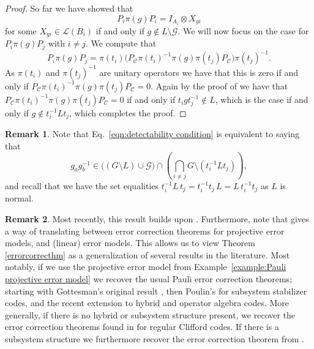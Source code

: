 \documentclass[11pt]{article}
\theoremstyle{definition}
\newtheorem*{remark}{Remark}
\newcommand{\calC}{\mathcal{C}}
\newcommand{\calG}{\mathcal{G}}
\newcommand{\calL}{\mathcal{L}}
\begin{document}
\begin{proof}
    So far we have showed that
    \[
        P_i \pi(g) P_i = I_{A_i} \otimes X_{gi}
    \]
    for some $X_{gi} \in \calL(B_i)$ if and only if $g \not\in L \setminus \calG$. We will now focus on the case for $P_i \pi(g) P_j$ with $i \neq j$. We compute that
    \[
        P_i \pi(g) P_j
        = \pi(t_i) \big( P_\calC \pi(t_i)^{-1} \pi(g) \pi(t_j) P_\calC \big) \pi(t_j)^{-1}.
    \]
    As $\pi(t_i)$ and $\pi(t_j)^{-1}$ are unitary operators we have that this is zero if and only if $P_\calC \pi(t_i)^{-1} \pi(g) \pi(t_j) P_\calC = 0$. Again by the proof of \cite[Theorem 6.3]{Eidesen2025} we have that $P_\calC \pi(t_i)^{-1} \pi(g) \pi(t_j) P_\calC = 0$ if and only if $t_i g t_j^{-1} \not\in L$, which is the case if and only if $g \not\in t_i^{-1} L t_j$, which completes the proof.
\end{proof}

\begin{remark}
    Note that Eq.~\eqref{eqn:detectability condition} is equivalent to saying that
    \begin{equation}\label{eqn:detectability condition alternate}
        g_ag_b^{-1} \in \big((G \setminus L) \cup \calG \big) \cap \left(\bigcap_{i \neq j} G \setminus (t_i^{-1}Lt_j)\right), 
    \end{equation}
    and recall that we have the set equalities $t_i^{-1}L\, t_j = t_i^{-1} t_j \, L = L \, t_i^{-1}t_j$ as $L$ is normal. 
\end{remark}

\begin{remark}
    Most recently, this result builds upon \cite[Theorem 6.3]{Eidesen2025}. Furthermore, note that \cite[Proposition 3.5]{Eidesen2025} gives a way of translating between error correction theorems for projective error models, and (linear) error models. This allows us to view Theorem \ref{errorcorrecthm} as a generalization of several results in the literature. Most notably, if we use the projective error model from Example~\ref{example:Pauli projective error model} we recover the usual Pauli error correction theorems; starting with Gottesman's original result \cite{gottesman1996class,gottesman1997stabilizer}, then Poulin's \cite{Poulin2005Stabilizer} for subsystem stabilizer codes, and the recent extension \cite{DauphinaiKribsVasmer2024} to hybrid and operator algebra codes. More generally, if there is no hybrid or subsystem structure present, we recover the error correction theorems found in \cite{KnillI96,KnillII96,KlappeneckerRottelerII02} for regular Clifford codes. If there is a subsystem structure we furthermore recover the error correction theorem from \cite{klappenecker2010clifford}. 
\end{remark} 
\end{document}

